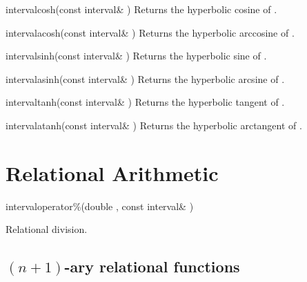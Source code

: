 \documentclass{manual}
\begin{document}
\begin{deffun}{interval}{cosh}{(const interval\& )}
  Returns the hyperbolic cosine of .
\end{deffun}

\begin{deffun}{interval}{acosh}{(const interval\& )}
  Returns the hyperbolic arccosine of .
\end{deffun}

\begin{deffun}{interval}{sinh}{(const interval\& )}
  Returns the hyperbolic sine of .
\end{deffun}

\begin{deffun}{interval}{asinh}{(const interval\& )}
  Returns the hyperbolic arcsine of .
\end{deffun}

\begin{deffun}{interval}{tanh}{(const interval\& )}
  Returns the hyperbolic tangent of .
\end{deffun}

\begin{deffun}{interval}{atanh}{(const interval\& )}
  Returns the hyperbolic arctangent of .
\end{deffun}

\section{Relational Arithmetic}\label{sec:relational-arithmetic}

\begin{deffun}{interval}{operator\%}{(double , const interval\& )}
  \begin{operation}
  \end{operation}
Relational division.
\end{deffun}

\subsection{$(n+1)$-ary relational functions}
\end{document}
